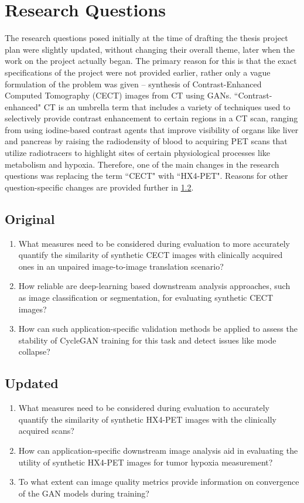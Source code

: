 \section{Research Questions}
The research questions posed initially at the time of drafting the thesis project plan were slightly updated, without changing their overall theme, later when the work on the project actually began. The primary reason for this is that the exact specifications of the project were not provided earlier, rather only a vague formulation of the problem was given -- synthesis of Contrast-Enhanced Computed Tomography (CECT) images from CT using GANs. ``Contrast-enhanced" CT is an umbrella term that includes a variety of techniques used to selectively provide contrast enhancement to certain regions in a CT scan, ranging from using iodine-based contrast agents that improve visibility of organs like liver and pancreas by raising the radiodensity of blood to acquiring PET scans that utilize radiotracers to highlight sites of certain physiological processes like metabolism and hypoxia. Therefore, one of the main changes in the research questions was replacing the term ``CECT" with ``HX4-PET". Reasons for other question-specific changes are provided further in \ref{updated_research_questions}.


\subsection{Original}
\begin{enumerate}
    \item What measures need to be considered during evaluation to more accurately quantify the similarity of synthetic CECT images with clinically acquired ones in an unpaired image-to-image translation scenario?
    \item How reliable are deep-learning based downstream analysis approaches, such as image classification or segmentation, for evaluating synthetic CECT images?
    \item How can such application-specific validation methods be applied to assess the stability of CycleGAN training for this task and detect issues like mode collapse?
\end{enumerate}


\subsection{Updated}
\label{updated_research_questions}

\begin{enumerate}
    \item What measures need to be considered during evaluation to accurately quantify the similarity of synthetic HX4-PET images with the clinically acquired scans?
    \item How can application-specific downstream image analysis aid in evaluating the utility of synthetic HX4-PET images for tumor hypoxia measurement?
    \item To what extent can image quality metrics provide information on convergence of the GAN models during training?
\end{enumerate}

